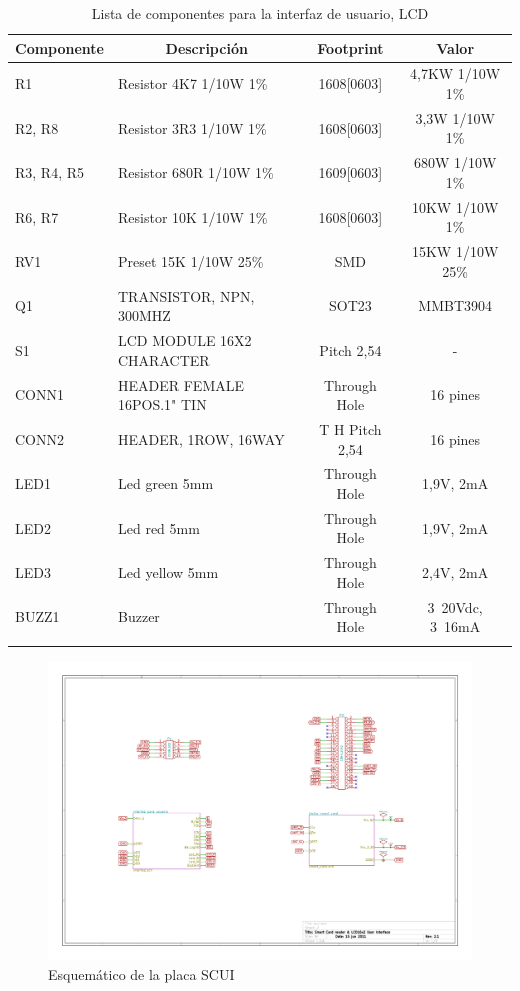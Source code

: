 \newpage
\begin{longtable}{|l|l|c|c|}
\hline
\multicolumn{1}{|c|}{\textbf{Componente}} & \multicolumn{1}{c|}{\textbf{Descripción}} & \textbf{ Footprint} & \textbf{Valor} \\ \hline
R1 & Resistor 4K7    1/10W     1\% & 1608[0603] & 4,7KW  1/10W   1\% \\ \hline
R2, R8 & Resistor 3R3    1/10W     1\% & 1608[0603] & 3,3W    1/10W   1\% \\ \hline
R3, R4, R5 & Resistor 680R  1/10W     1\% & 1609[0603] & 680W   1/10W   1\% \\ \hline
R6, R7 & Resistor 10K    1/10W     1\% & 1608[0603] & 10KW  1/10W   1\% \\ \hline
RV1 & Preset 15K        1/10W  25\% & SMD & 15KW   1/10W  25\% \\ \hline
Q1 & TRANSISTOR, NPN, 300MHZ & SOT23 & MMBT3904 \\ \hline
S1 & LCD MODULE 16X2 CHARACTER & Pitch 2,54 & - \\ \hline
CONN1 & HEADER FEMALE 16POS.1" TIN & Through Hole & 16 pines \\ \hline
CONN2 & HEADER, 1ROW, 16WAY & T H Pitch 2,54 & 16 pines \\ \hline
LED1 & Led green 5mm & Through Hole & 1,9V,  2mA \\ \hline
LED2 & Led red 5mm & Through Hole & 1,9V,  2mA \\ \hline
LED3 & Led yellow 5mm & Through Hole & 2,4V,  2mA \\ \hline
BUZZ1 & Buzzer & Through Hole & 3~20Vdc, 3~16mA \\ \hline
\caption{Lista de componentes para la interfaz de usuario, LCD}
\label{}
\end{longtable}

\begin{figure}[H]
\centering
  \begin{center}
   \includegraphics[angle=90]{Imagenes/scui.jpg}
  \end{center}
  \caption{Esquemático de la placa SCUI}\label{Fig:HW} 
\end{figure}

